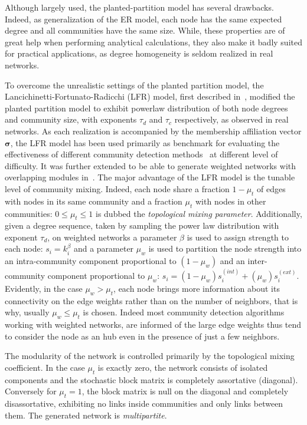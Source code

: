 Although largely used, the planted-partition model has several drawbacks.
Indeed, as generalization of the ER model, each node has the same expected degree and all communities have the same size.
While, these properties are of great help when performing analytical calculations, they also make it badly suited for practical applications, as degree homogeneity is seldom realized in real networks.

To overcome the unrealistic settings of the planted partition model, the Lancichinetti\hyp{}Fortunato\hyp{}Radicchi (LFR) model, first described in~\cite{lancichinetti2008}, modified the planted partition model to exhibit powerlaw distribution of both node degrees and community size, with exponents $\tau_d$ and $\tau_c$ respectively, as observed in real networks.
As each realization is accompanied by the membership affiliation vector $\boldsymbol \sigma$, the LFR model has been used primarily as benchmark for evaluating the effectiveness of different community detection methods~\cite{fortunato2010,lancichinetti2009} at different level of difficulty. It was further extended to be able to generate weighted networks with overlapping modules in~\cite{lancichinetti2009a}.
The major advantage of the LFR model is the tunable level of community mixing. Indeed, each node share a fraction $1-\mu_t$ of edges with nodes in its same community and a fraction $\mu_t$ with nodes in other communities: $0 \leq \mu_t \leq 1$ is dubbed the \emph{topological mixing parameter}. Additionally, given a degree sequence, taken by sampling the power law distribution with exponent $\tau_d$, on weighted networks a parameter $\beta$ is used to assign strength to each node: $s_i=k_i^\beta$ and a parameter $\mu_w$ is used to partition the node strength into an intra-community component proportional to $(1-\mu_w)$ and an inter-community component proportional to $\mu_w$: $s_i = (1-\mu_w)s_i^{(int)} + (\mu_w)s_i^{(ext)}$. Evidently, in the case $\mu_w > \mu_t$, each node brings more information about its connectivity on the edge weights rather than on the number of neighbors, that is why, usually $\mu_w \leq \mu_t$ is chosen. Indeed most community detection algorithms working with weighted networks, are informed of the large edge weights thus tend to consider the node as an hub even in the presence of just a few neighbors.

The modularity of the network is controlled primarily by the topological mixing coefficient. In the case $\mu_t$ is exactly zero, the network consists of isolated components and the stochastic block matrix is completely assortative (diagonal). Conversely for $\mu_t=1$, the block matrix is null on the diagonal and completely disassortative, exhibiting no links inside communities and only links between them. The generated network is \emph{multipartite}.

